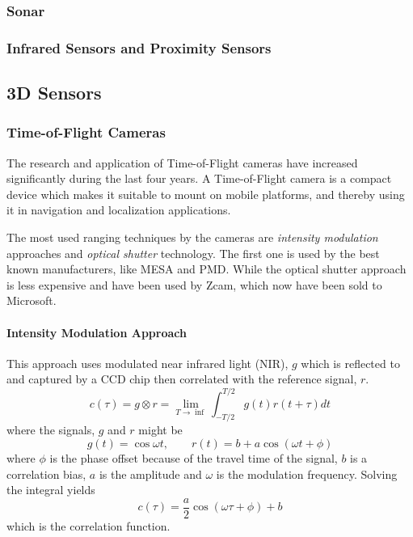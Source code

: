 \subsubsection{Sonar}


\subsubsection{Infrared Sensors and Proximity Sensors}


\subsection{3D Sensors}


\subsubsection{Time-of-Flight Cameras}
The research and application of Time-of-Flight cameras have increased significantly during the last four
years. A Time-of-Flight camera is a compact device which makes it suitable to mount on
mobile platforms, and thereby using it in navigation and localization applications. 

The most used ranging techniques by the cameras are \emph{intensity modulation} approaches and
\emph{optical shutter} technology. The first one is used by the best known manufacturers,
like MESA and PMD. While the optical shutter approach is less expensive and have been used
by Zcam, which now have been sold to Microsoft. 


\paragraph{Intensity Modulation Approach}
This approach uses modulated near infrared light (NIR), $g$ which is reflected to and
captured by a CCD chip then correlated with the reference signal, $r$. 
\begin{equation}
    c(\tau) = g \otimes r = \lim_{T \rightarrow \inf} \int^{T/2}_{-T/2} g(t) r(t + \tau) dt
\end{equation}
where the signals, $g$ and $r$ might be
\begin{equation}
    g(t) = \cos{\omega t}, \quad \quad r(t) = b + a \cos{(\omega t + \phi)}
\end{equation}
where $\phi$ is the phase offset because of the travel time of the signal, $b$ is a
correlation bias, $a$ is the amplitude and $\omega$ is the modulation frequency. Solving
the integral yields 
\begin{equation}
    c(\tau) = \frac{a}{2} \cos{(\omega \tau + \phi )} + b
\end{equation}
which is the correlation function. 

